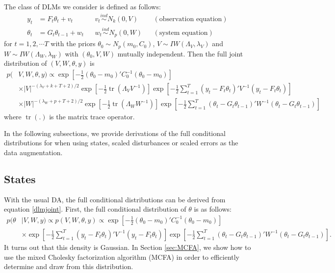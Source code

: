 \documentclass{article}
\DeclareMathOperator{\tr}{tr}
\begin{document}
The class of DLMs we consider is defined as follows:
\begin{align}
y_t &= F_t\theta_t + v_t && v_t \stackrel{ind}{\sim} N_k(0,V) && (\mbox{observation equation}) \label{dlmtdobseq}\\
 \theta_t &= G_t\theta_{t-1} + w_t && w_t \stackrel{ind}{\sim} N_p(0,W) && (\mbox{system equation}) \label{dlmtdsyseq}
\end{align}
for $t=1,2,\cdots T$ with the priors $\theta_0 \sim N_p(m_0, C_0)$, $V \sim IW(\Lambda_V, \lambda_V)$ and $W \sim IW(\Lambda_W, \lambda_W)$ with $(\theta_0,V,W)$ mutually independent. Then the full joint distribution of $(V,W,\theta,y)$ is
\begin{align}
  p(&V,W,\theta,y) \propto \exp\left[-\frac{1}{2}(\theta_0-m_0)'C_0^{-1}(\theta_0-m_0)\right] \nonumber\\
  &\times   |V|^{-(\lambda_V + k + T + 2)/2}\exp\left[-\frac{1}{2}\tr\left(\Lambda_VV^{-1}\right)\right] \exp\left[-\frac{1}{2}\sum_{t=1}^T(y_t - F_t\theta_t)'V^{-1}(y_t - F_t\theta_t)\right] \nonumber\\
   & \times |W|^{-(\lambda_W + p + T + 2)/2}\exp\left[-\frac{1}{2}\tr\left(\Lambda_WW^{-1}\right)\right]\exp\left[-\frac{1}{2}\sum_{t=1}^T(\theta_t-G_t\theta_{t-1})'W^{-1}(\theta_t-G_t\theta_{t-1})\right]\label{dlmjoint}
 \end{align}
where $\tr(.)$ is the matrix trace operator.

In the following subsections, we provide derivations of the full conditional distributions for when using states, scaled disturbances or scaled errors as the data augmentation. 

\subsection{States}\label{subsec:states}

With the usual DA, the full conditional distributions can be derived from equation \eqref{dlmjoint}. First, the full conditional distribution of $\theta$ is as follows:
\begin{align*}
p(\theta&|V,W,y) \propto p(V,W,\theta,y) \propto \exp\left[-\frac{1}{2}(\theta_0-m_0)'C_0^{-1}(\theta_0-m_0)\right] \\
  &\times \exp\left[-\frac{1}{2}\sum_{t=1}^T(y_t - F_t\theta_t)'V^{-1}(y_t - F_t\theta_t)\right] \exp\left[-\frac{1}{2}\sum_{t=1}^T(\theta_t-G_t\theta_{t-1})'W^{-1}(\theta_t-G_t\theta_{t-1})\right].
\end{align*}
It turns out that this density is Gaussian. In Section \ref{sec:MCFA}, we show how to use the mixed Cholesky factorization algorithm (MCFA) in order to efficiently determine and draw from this distribution.
\end{document}
